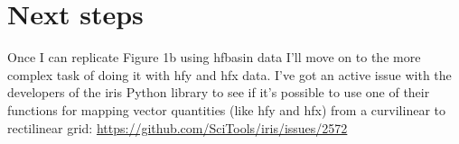 \section{Next steps}

Once I can replicate Figure 1b using hfbasin data I'll move on to the more complex task of doing it with hfy and hfx data. I've got an active issue with the developers of the iris Python library to see if it's possible to use one of their functions for mapping vector quantities (like hfy and hfx) from a curvilinear to rectilinear grid: \url{https://github.com/SciTools/iris/issues/2572}